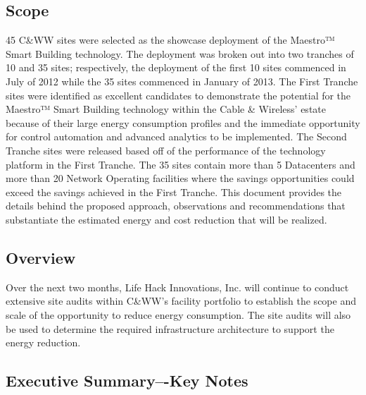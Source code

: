   
\subsection{Scope}

45 C\&WW sites were selected as the showcase deployment of the Maestro™ Smart Building technology. The deployment was broken out into two tranches of 10 and 35 sites; respectively, the deployment of the first 10 sites commenced in July of 2012 while the 35 sites commenced in January of 2013.  The First Tranche sites were identified as excellent candidates to demonstrate the potential for the Maestro™ Smart Building technology within the Cable \& Wireless’ estate because of their large energy consumption profiles and the immediate opportunity for control automation and advanced analytics to be implemented. The Second Tranche sites were released based off of the performance of the technology platform in the First Tranche. The 35 sites contain more than 5 Datacenters and more than 20 Network Operating facilities where the savings opportunities could exceed the savings achieved in the First Tranche. 
This document provides the details behind the proposed approach, observations and recommendations that substantiate the estimated energy and cost reduction that will be realized.


\subsection{Overview}

Over the next two months, Life Hack Innovations, Inc. will continue to conduct extensive site audits within C\&WW’s facility portfolio to establish the scope and scale of the opportunity to reduce energy consumption. The site audits will also be used to determine the required infrastructure architecture to support the energy reduction.

\subsection{Executive Summary–-Key Notes}

